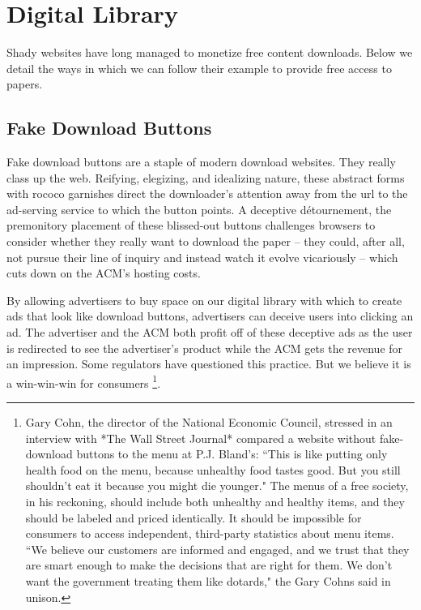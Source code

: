 \section{Digital Library}
\label{sec:lib}
Shady websites have long managed to monetize free content downloads.
Below we detail the ways in which we can follow their example to provide free
access to papers.

\subsection{Fake Download Buttons}
\label{sec:fake}

Fake download buttons are a staple of modern download websites. They really class up the web. Reifying, elegizing, and idealizing nature, these abstract forms with rococo garnishes direct the downloader's attention away from the url to the ad-serving service to which the button points. A deceptive d\'{e}tournement, the premonitory placement of these blissed-out buttons challenges browsers to consider whether they really want to download the paper -- they could, after all, not pursue their line of inquiry and instead watch it evolve vicariously -- which cuts down on the ACM's hosting costs.

By allowing advertisers to buy space on our digital library with which to
create ads that look like download buttons, advertisers can deceive users into
clicking an ad.
The advertiser and the ACM both profit off of these deceptive ads as the user
is redirected to see the advertiser's product while the ACM gets the revenue
for an impression. Some regulators have questioned this practice. But we believe it is a win-win-win for consumers \footnote{Gary Cohn, the director of the National Economic Council, stressed in an interview with *The Wall Street Journal* compared a website without fake-download buttons to the menu at P.J. Bland's: ``This is like putting only health food on the menu, because unhealthy food tastes good. But you still shouldn't eat it because you might die younger." The menus of a free society, in his reckoning, should include both unhealthy and healthy items, and they should be labeled and priced identically. It should be impossible for consumers to access independent, third-party statistics about menu items. ``We believe our customers are informed and engaged, and we trust that they are smart enough to make the decisions that are right for them. We don't want the government treating them like dotards," the Gary Cohns said in unison.}.


